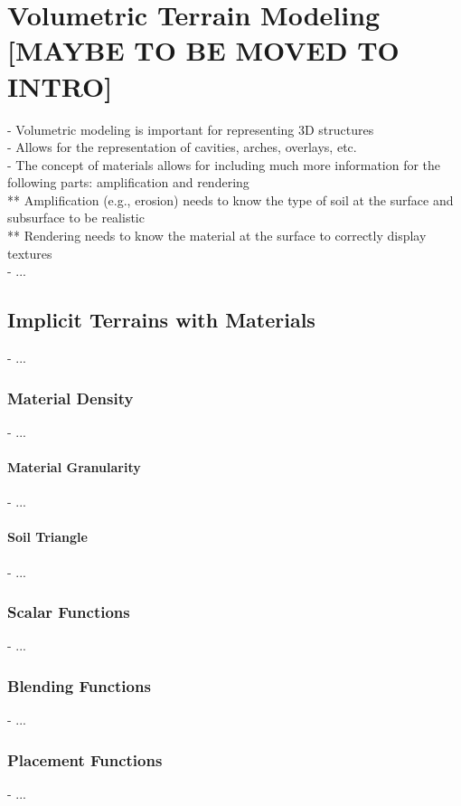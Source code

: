 \chapter{Volumetric Terrain Modeling [MAYBE TO BE MOVED TO INTRO]}
\label{chap:volumic-modeling}
\minitoc

- Volumetric modeling is important for representing 3D structures \\
- Allows for the representation of cavities, arches, overlays, etc. \\
- The concept of materials allows for including much more information for the following parts: amplification and rendering \\
** Amplification (e.g., erosion) needs to know the type of soil at the surface and subsurface to be realistic \\
** Rendering needs to know the material at the surface to correctly display textures \\
- ...

\section{Implicit Terrains with Materials}
\label{sec:volumic-modeling_implicit-terrain-with-materials}
- ...

\subsection{Material Density}
- ...

\subsubsection{Material Granularity}
- ...

\subsubsection{Soil Triangle}
- ...

\subsection{Scalar Functions}
- ...

\subsection{Blending Functions}
- ...

\subsection{Placement Functions}
- ...

